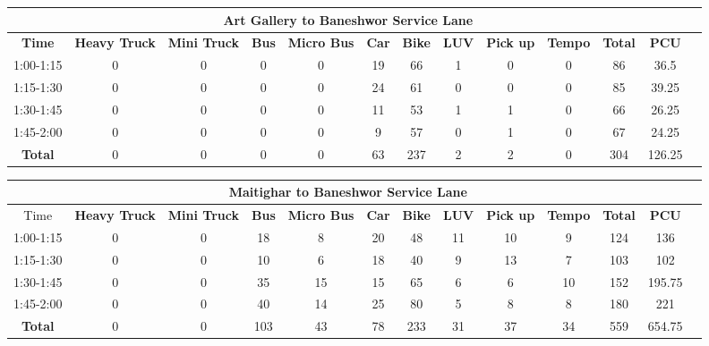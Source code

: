 \begin{landscape}
\centering
\begin{table}[h!]
\centering
\begin{tabular}{|c|c|c|c|c|c|c|c|c|c|c|c|c|}
    \hline
    \multicolumn{12}{|c|}{\textbf{Art Gallery to Baneshwor Service Lane}} \\
    \hline
    \textbf{Time} & \textbf{Heavy Truck} & \textbf{Mini Truck} & \textbf{Bus} & \textbf{Micro Bus} & \textbf{Car} & \textbf{Bike} & \textbf{LUV} & \textbf{Pick up} & \textbf{Tempo} & \textbf{\textbf{Total}} & \textbf{PCU} \\
    \hline
1:00-1:15	&0	&0	&0	&0	&19	&66	&1	&0	&0	&86	&36.5 \\ \hline
1:15-1:30	&0	&0	&0	&0	&24	&61	&0	&0	&0	&85	&39.25 \\ \hline
1:30-1:45	&0	&0	&0	&0	&11	&53	&1	&1	&0	&66	&26.25 \\ \hline
1:45-2:00	&0	&0	&0	&0	&9	&57	&0	&1	&0	&67	&24.25 \\ \hline
\textbf{Total}	&0	&0	&0	&0	&63	&237	&2	&2	&0	&304	&126.25 \\ \hline

\end{tabular}

\vspace{0.5cm}


\begin{tabular}{|c|c|c|c|c|c|c|c|c|c|c|c|c|}
    \hline
    \multicolumn{12}{|c|}{\textbf{Maitighar to Baneshwor Service Lane}} \\
    \hline
    Time & \textbf{Heavy Truck} & \textbf{Mini Truck} & \textbf{Bus} & \textbf{Micro Bus} & \textbf{Car} & \textbf{Bike} & \textbf{LUV} & \textbf{Pick up} & \textbf{Tempo} & \textbf{\textbf{Total}} & \textbf{PCU} \\
    \hline
    1:00-1:15	&0	&0	&18	&8	&20	&48	&11	&10	&9	&124	&136 \\ \hline
    1:15-1:30	&0	&0	&10	&6	&18	&40	&9	&13	&7	&103	&102 \\ \hline
    1:30-1:45	&0	&0	&35	&15	&15	&65	&6	&6	&10	&152	&195.75 \\ \hline
    1:45-2:00	&0	&0	&40	&14	&25	&80	&5	&8	&8	&180	&221 \\ \hline
    \textbf{Total}	&0	&0	&103	&43	&78	&233	&31	&37	&34	&559	&654.75 \\ \hline
\end{tabular}


\end{table}
\end{landscape}
